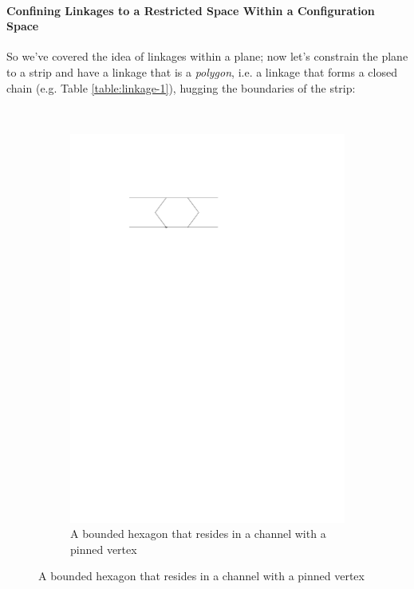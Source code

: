\paragraph{Confining Linkages to a Restricted Space Within a Configuration Space}
So we've covered the idea of linkages within a plane; now let's constrain the plane to a strip and 
have a linkage that is a \textit{polygon}, i.e. a linkage that forms a closed chain (e.g. Table 
\ref{table:linkage-1}), hugging the boundaries of the strip:
\begin{figure}[h]
\begin{center}
  ~ %
  \begin{subfigure}[b]{0.49\textwidth}
	  \includegraphics[width=\textwidth]{graphics/hexagonInChannelWithPinnedJointRight.pdf}
	  \caption{A bounded hexagon that resides in a channel with a pinned vertex}

\end{subfigure}
\end{center}
\end{figure}
